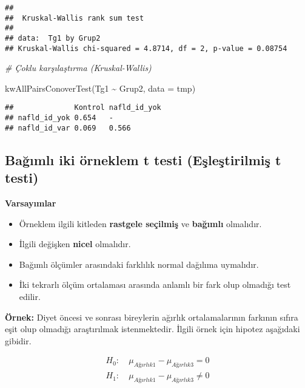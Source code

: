 \documentclass[
]{article}
\newenvironment{Shaded}{\begin{snugshade}}{\end{snugshade}}
\newcommand{\AttributeTok}[1]{\textcolor[rgb]{0.77,0.63,0.00}{#1}}
\newcommand{\CommentTok}[1]{\textcolor[rgb]{0.56,0.35,0.01}{\textit{#1}}}
\newcommand{\FunctionTok}[1]{\textcolor[rgb]{0.00,0.00,0.00}{#1}}
\newcommand{\NormalTok}[1]{#1}
\newcommand{\SpecialCharTok}[1]{\textcolor[rgb]{0.00,0.00,0.00}{#1}}
\providecommand{\tightlist}{%
  \setlength{\itemsep}{0pt}\setlength{\parskip}{0pt}}
\begin{document}
\begin{verbatim}
## 
##  Kruskal-Wallis rank sum test
## 
## data:  Tg1 by Grup2
## Kruskal-Wallis chi-squared = 4.8714, df = 2, p-value = 0.08754
\end{verbatim}

\begin{Shaded}
\begin{Highlighting}[]
\CommentTok{\# Çoklu karşılaştırma (Kruskal{-}Wallis)}

\FunctionTok{kwAllPairsConoverTest}\NormalTok{(Tg1 }\SpecialCharTok{\textasciitilde{}}\NormalTok{ Grup2, }\AttributeTok{data =}\NormalTok{ tmp)}
\end{Highlighting}
\end{Shaded}

\begin{verbatim}
##              Kontrol nafld_id_yok
## nafld_id_yok 0.654   -           
## nafld_id_var 0.069   0.566
\end{verbatim}

\hypertarget{baux11fux131mlux131-iki-uxf6rneklem-t-testi-eux15fleux15ftirilmiux15f-t-testi}{%
\subsection{Bağımlı iki örneklem t testi (Eşleştirilmiş t
testi)}\label{baux11fux131mlux131-iki-uxf6rneklem-t-testi-eux15fleux15ftirilmiux15f-t-testi}}

\textbf{Varsayımlar}

\begin{itemize}
\tightlist
\item
  Örneklem ilgili kitleden \textbf{rastgele seçilmiş} ve
  \textbf{bağımlı} olmalıdır.
\item
  İlgili değişken \textbf{nicel} olmalıdır.
\item
  Bağımlı ölçümler arasındaki farklılık normal dağılıma uymalıdır.
\item
  İki tekrarlı ölçüm ortalaması arasında anlamlı bir fark olup olmadığı
  test edilir.
\end{itemize}

\textbf{Örnek:} Diyet öncesi ve sonrası bireylerin ağırlık
ortalamalarının farkının sıfıra eşit olup olmadığı araştırılmak
istenmektedir. İlgili örnek için hipotez aşağıdaki gibidir.

\begin{align*}
  H_0:&~ \mu_{Ağırlık1} - \mu_{Ağırlık3} = 0 \\
  H_1:&~ \mu_{Ağırlık1} - \mu_{Ağırlık3} \neq 0
\end{align*}
\end{document}

